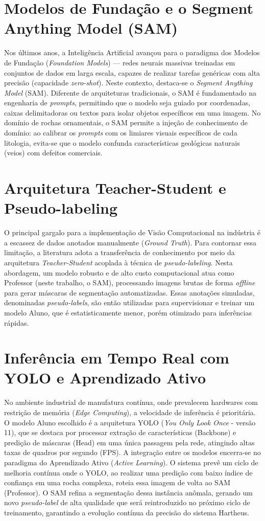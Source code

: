 \section{Modelos de Fundação e o Segment Anything Model (SAM)}
Nos últimos anos, a Inteligência Artificial avançou para o paradigma dos Modelos de Fundação (\textit{Foundation Models}) — redes neurais massivas treinadas em conjuntos de dados em larga escala, capazes de realizar tarefas genéricas com alta precisão (capacidade \textit{zero-shot}). Neste contexto, destaca-se o \textit{Segment Anything Model} (SAM). Diferente de arquiteturas tradicionais, o SAM é fundamentado na engenharia de \textit{prompts}, permitindo que o modelo seja guiado por coordenadas, caixas delimitadoras ou textos para isolar objetos específicos em uma imagem. No domínio de rochas ornamentais, o SAM permite a injeção de conhecimento de domínio: ao calibrar os \textit{prompts} com os limiares visuais específicos de cada litologia, evita-se que o modelo confunda características geológicas naturais (veios) com defeitos comerciais.

\section{Arquitetura Teacher-Student e Pseudo-labeling}
O principal gargalo para a implementação de Visão Computacional na indústria é a escassez de dados anotados manualmente (\textit{Ground Truth}). Para contornar essa limitação, a literatura adota a transferência de conhecimento por meio da arquitetura \textit{Teacher-Student} acoplada à técnica de \textit{pseudo-labeling}. Nesta abordagem, um modelo robusto e de alto custo computacional atua como Professor (neste trabalho, o SAM), processando imagens brutas de forma \textit{offline} para gerar máscaras de segmentação automatizadas. Essas anotações simuladas, denominadas \textit{pseudo-labels}, são então utilizadas para supervisionar e treinar um modelo Aluno, que é estatisticamente menor, porém otimizado para inferências rápidas.

\section{Inferência em Tempo Real com YOLO e Aprendizado Ativo}
No ambiente industrial de manufatura contínua, onde prevalecem hardwares com restrição de memória (\textit{Edge Computing}), a velocidade de inferência é prioritária. O modelo Aluno escolhido é a arquitetura YOLO (\textit{You Only Look Once} - versão 11), que se destaca por processar extração de características (Backbone) e predição de máscaras (Head) em uma única passagem pela rede, atingindo altas taxas de quadros por segundo (FPS). 
A integração entre os modelos encerra-se no paradigma do Aprendizado Ativo (\textit{Active Learning}). O sistema prevê um ciclo de melhoria contínua onde o YOLO, ao realizar uma predição com baixo índice de confiança em uma rocha complexa, roteia essa imagem de volta ao SAM (Professor). O SAM refina a segmentação dessa instância anômala, gerando um novo \textit{pseudo-label} de alta qualidade que será reintroduzido no próximo ciclo de treinamento, garantindo a evolução contínua da precisão do sistema Hartheus.

